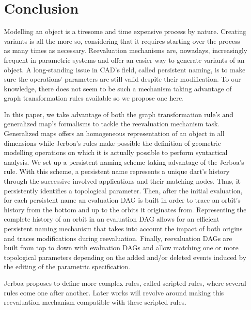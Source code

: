 \section{Conclusion}

Modelling an object is a tiresome and time expensive process by nature. %
Creating variants is all the more so, considering that it requires starting over
the process as many times as necessary. %
Reevaluation mechanisms are, nowadays, increasingly frequent in parametric
systems and offer an easier way to generate variants of an object. %
A long-standing issue in CAD's field, called persistent naming, is to make sure
the operations' parameters are still valid despite their modification. %
To our knowledge, there does not seem to be such a mechanism taking advantage of
graph transformation rules available so we propose one here. %

In this paper, we take advantage of both the graph transformation rule's and
generalized map's formalisms to tackle the reevaluation mechanism task. %
Generalized maps offers an homogeneous representation of an object in all
dimensions while Jerboa's rules make possible the definition of geometric
modelling operations on which it is actually possible to perform syntactical
analysis. %
We set up a persistent naming scheme taking advantage of the Jerboa's rule. %
With this scheme, a persistent name represents a unique dart's history through
the successive involved applications and their matching nodes. %
Thus, it persistently identifies a topological parameter. %
Then, after the initial evaluation, for each persistent name an evaluation DAG
is built in order to trace an orbit's history from the bottom and up to the
orbits it originates from. %
Representing the complete history of an orbit in an evaluation DAG allows for an
efficient persistent naming mechanism that takes into account the impact of both
origins and traces modifications during reevaluation. %
Finally, reevaluation DAGs are built from top to down with evaluation DAGs and
allow matching one or more topological parameters depending on the added and/or
deleted events induced by the editing of the parametric specification. %

Jerboa proposes to define more complex rules, called scripted rules, where
several rules come one after another. %
Later works will revolve around making this reevaluation mechanism compatible
with these scripted rules. %

